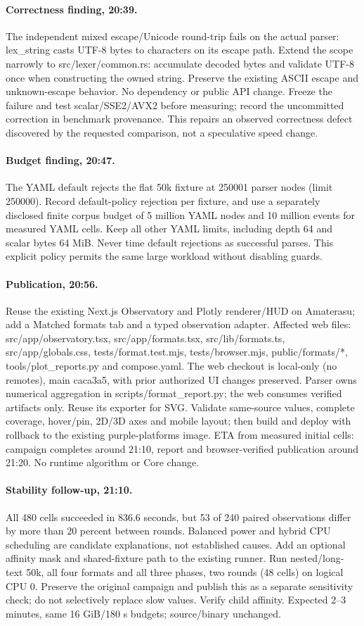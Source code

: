 \documentclass[11pt,a4paper]{article}
\begin{document}
\paragraph{Correctness finding, 20:39.} The independent mixed escape/Unicode
round-trip fails on the actual parser: lex\_string casts UTF-8 bytes to characters
on its escape path. Extend the scope narrowly to src/lexer/common.rs: accumulate
decoded bytes and validate UTF-8 once when constructing the owned string. Preserve
the existing ASCII escape and unknown-escape behavior. No dependency or public API
change. Freeze the failure and test scalar/SSE2/AVX2 before measuring; record the
uncommitted correction in benchmark provenance. This repairs an observed correctness
defect discovered by the requested comparison, not a speculative speed change.
\paragraph{Budget finding, 20:47.} The YAML default rejects the flat 50k fixture
at 250001 parser nodes (limit 250000). Record default-policy rejection per fixture,
and use a separately disclosed finite corpus budget of 5 million YAML nodes and
10 million events for measured YAML cells. Keep all other YAML limits, including
depth 64 and scalar bytes 64 MiB. Never time default rejections as successful parses.
This explicit policy permits the same large workload without disabling guards.
\paragraph{Publication, 20:56.} Reuse the existing Next.js Observatory and Plotly
renderer/HUD on Amaterasu; add a Matched formats tab and a typed observation adapter.
Affected web files: src/app/observatory.tsx, src/app/formats.tsx,
src/lib/formats.ts, src/app/globals.css, tests/format.test.mjs,
tests/browser.mjs, public/formats/*, tools/plot\_reports.py and compose.yaml.
The web checkout is local-only (no remotes), main caca3a5, with prior authorized
UI changes preserved. Parser owns numerical aggregation in scripts/format\_report.py;
the web consumes verified artifacts only. Reuse its exporter for SVG. Validate
same-source values, complete coverage, hover/pin, 2D/3D axes and mobile layout;
then build and deploy with rollback to the existing purple-platforms image.
ETA from measured initial cells: campaign completes around 21:10, report and
browser-verified publication around 21:20. No runtime algorithm or Core change.
\paragraph{Stability follow-up, 21:10.} All 480 cells succeeded in 836.6 seconds,
but 53 of 240 paired observations differ by more than 20 percent between rounds.
Balanced power and hybrid CPU scheduling are candidate explanations, not established
causes. Add an optional affinity mask and shared-fixture path to the existing runner.
Run nested/long-text 50k, all four formats and all three phases, two rounds (48 cells)
on logical CPU 0. Preserve the original campaign and publish this as a separate
sensitivity check; do not selectively replace slow values. Verify child affinity.
Expected 2--3 minutes, same 16 GiB/180 s budgets; source/binary unchanged.
\end{document}
